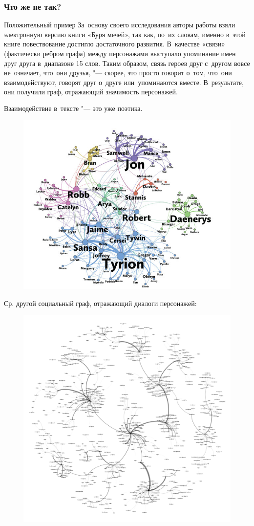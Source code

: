 \documentclass{beamer}
\begin{document}
\begin{frame}
\frametitle{Что же не так?}
\begin{block}{Положительный пример}
\cite{p6} За~основу своего исследования авторы работы взяли электронную версию книги «Буря мечей», так как, по~их словам, именно в~этой книге повествование достигло достаточного развития. В~качестве «связи» (фактически ребром графа) между персонажами выступало упоминание имен друг друга в~диапазоне 15 слов. Таким образом, связь героев друг с~другом вовсе не~означает, что~они друзья, "--- скорее, это просто говорит о~том, что~они взаимодействуют, говорят друг о~друге или~упоминаются вместе. В~результате, они получили граф, отражающий значимость персонажей.
\end{block}

Взаимодействие в~тексте "--- это уже поэтика.

\end{frame}

\begin{frame}
\begin{figure}
\includegraphics[width=0.8\linewidth]{networkofthrones}
\end{figure}
\cite{p6}
\end{frame}

\begin{frame}
Ср. другой социальный граф, отражающий диалоги персонажей:
\begin{figure}
\includegraphics[width=0.6\linewidth]{networkofthrones2}
\end{figure}
\cite{p10}
\end{frame}
\end{document}
